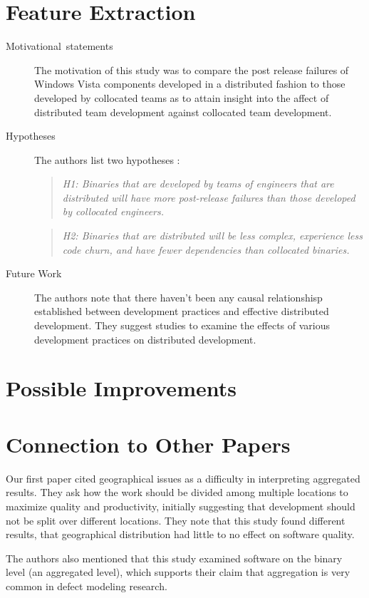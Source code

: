 \documentclass[english]{article}
\begin{document}
\section*{Feature Extraction}
\begin{description}
\item [{Motivational~statements}] The motivation of this study was to compare the post release failures of Windows Vista components developed in a distributed fashion to those developed by collocated teams as to attain insight into the affect of distributed team development against collocated team development.
\item[Hypotheses] The authors list two hypotheses \cite{bird09}: 
\begin{quote}
\emph{H1: Binaries that are developed by teams of engineers that are distributed will have more post-release failures than those developed by collocated engineers.}
\end{quote}
\begin{quote}
\emph{H2: Binaries that are distributed will be less complex, experience less code churn, and have fewer dependencies than collocated binaries.}
\end{quote}
\item[Future Work] The authors note that there haven't been any causal relationshisp established between development practices and effective distributed development. They suggest studies to examine the effects of various development practices on distributed development.
\end{description}

\section*{Possible Improvements}

\section*{Connection to Other Papers}
	Our first paper \cite{posnett11} cited geographical issues as a difficulty in interpreting aggregated results. They ask how the work should be divided among multiple locations to maximize quality and productivity, initially suggesting that development should not be split over different locations. They note that this study found different results, that geographical distribution had little to no effect on software quality. 

The authors also mentioned that this study examined software on the binary level (an aggregated level), which supports their claim that aggregation is very common in defect modeling research.




\end{document}
